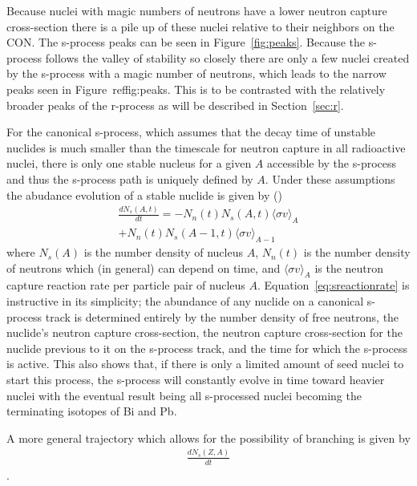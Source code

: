 Because nuclei with magic numbers of neutrons have a lower neutron
capture cross-section there is a pile up of these nuclei relative to
their neighbors on the CON.  The s-process peaks can be seen in Figure~\ref{fig:peaks}. Because the s-process follows the valley of
stability so closely there are only a few nuclei created by the
s-process with a magic number of neutrons, which leads to the narrow
peaks seen in Figure~ref{fig:peaks}.  This is to be contrasted with the
relatively broader peaks of the r-process as will be described in
Section~\ref{sec:r}. 

For the canonical s-process, which assumes that the decay time of
unstable nuclides is much smaller than the timescale for neutron
capture in all radioactive nuclei, there is only one stable nucleus
for a given $A$ accessible by the s-process and thus the s-process
path is uniquely defined by $A$.  Under these assumptions the abudance
evolution of a stable nuclide is given by (\citealt{iliadis2008})
\begin{multline}
\label{eq:sreactionrate}
\frac{dN_s(A,t)}{dt} = - N_n(t)N_s(A,t)\langle \sigma v \rangle_A \\
+N_n(t)N_s(A-1,t)\langle \sigma v \rangle_{A-1}
\end{multline}
where $N_s(A)$ is the number density of nucleus $A$, $N_n(t)$ is the
number density of neutrons which (in general) can depend on time, and
$\langle \sigma v \rangle_A$ is the
neutron capture reaction rate per particle pair of nucleus $A$.
Equation~\ref{eq:sreactionrate} is instructive in its simplicity; the
abundance of any nuclide on a canonical s-process track is determined
entirely by the number density of free neutrons, the nuclide's neutron
capture cross-section, the neutron capture cross-section for the
nuclide previous to it on the s-process track, and the time for which
the s-process is active.  This also shows that, if there is only a
limited amount of seed nuclei to start this process, the s-process
will constantly evolve in time toward heavier nuclei with the eventual
result being all s-processed nuclei becoming the terminating isotopes
of Bi and Pb.  

A more general trajectory which allows for the possibility of
branching is given by
\begin{multline}
\frac{dN_s(Z,A)}{dt}
\end{multline}
.

